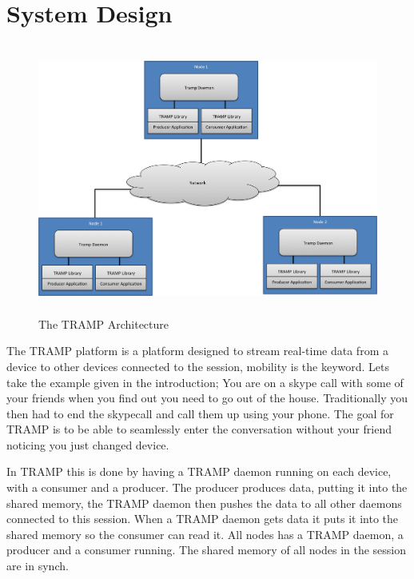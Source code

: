 \section{System Design}
\label{sec:design}

\begin{center}
\begin{figure}[ht!]
 \centering
 \includegraphics[width=6.0in, height=3.5in]{tramp_arch.png}
\caption{The TRAMP Architecture}
\end{figure}
\end{center}

The TRAMP platform is a platform designed to stream real-time data from a device to other devices connected to the session, mobility is the keyword. Lets take the example given in the introduction; You are on a skype call with some of your friends when you find out you need to go out of the house. Traditionally you then had to end the skypecall and call them up using your phone. The goal for TRAMP is to be able to seamlessly enter the conversation without your friend noticing you just changed device.

In TRAMP this is done by having a TRAMP daemon running on each device, with a consumer and a producer. The producer produces data, putting it into the shared memory, the TRAMP daemon then pushes the data to all other daemons connected to this session. When a TRAMP daemon gets data it puts it into the shared memory so the consumer can read it. All nodes has a TRAMP daemon, a producer and a consumer running. The shared memory of all nodes in the session are in synch.

